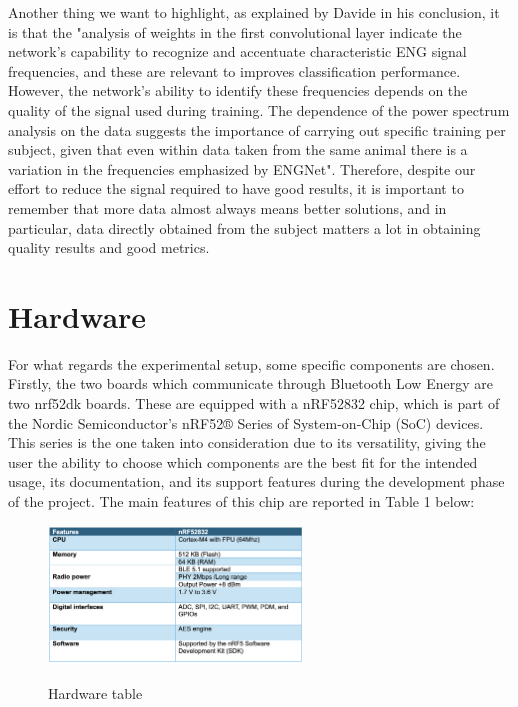 \documentclass{Configuration_Files/PoliMi3i_thesis}
\begin{document}
Another thing we want to highlight, as explained by Davide in his conclusion, it is that the "analysis of weights in the first convolutional layer indicate the network’s capability to recognize and accentuate characteristic ENG signal frequencies, and these are relevant to improves classification performance. However, the network’s ability to identify these frequencies depends on the quality of the signal used during training. The dependence of the power spectrum analysis on the data suggests the importance of carrying out specific training per subject, given that even within data taken from the same animal there is a variation in the frequencies emphasized by ENGNet".
Therefore, despite our effort to reduce the signal required to have good results, it is important to remember that more data almost always means better solutions, and in particular, data directly obtained from the subject matters a lot in obtaining quality results and good metrics.


\section*{Hardware}

For what regards the experimental setup, some specific components are chosen. Firstly, the two boards which communicate through Bluetooth Low Energy are two nrf52dk boards. These are equipped with a nRF52832 chip, which is part of the Nordic Semiconductor’s nRF52® Series of System-on-Chip (SoC) devices. This series is the one taken into consideration due to its versatility, giving the user the ability to choose which components are the best fit for the intended usage, its documentation, and its support features during the development phase of the project. The main features of this chip are reported in Table 1 below:

\begin{figure}[H]
    \centering
    \includegraphics[width=0.6\textwidth]{Materials/figure1}
    \label{materials_1}
    \caption{Hardware table}
\end{figure}
\end{document}
